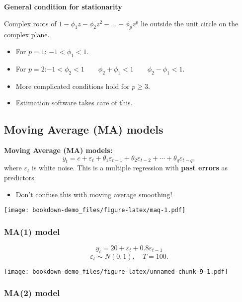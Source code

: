 \documentclass[]{book}
\providecommand{\tightlist}{%
  \setlength{\itemsep}{0pt}\setlength{\parskip}{0pt}}
\begin{document}
\textbf{General condition for stationarity}

Complex roots of \(1-\phi_1 z - \phi_2 z^2 - \dots - \phi_pz^p\) lie outside the unit circle on the complex plane.

\begin{itemize}
\tightlist
\item
  For \(p=1\): \(-1<\phi_1<1\).
\item
  For \(p=2\):\newline \(-1<\phi_2<1\qquad \phi_2+\phi_1 < 1 \qquad \phi_2 -\phi_1 < 1\).
\item
  More complicated conditions hold for \(p\ge3\).
\item
  Estimation software takes care of this.
\end{itemize}

\hypertarget{moving-average-ma-models}{%
\subsection{Moving Average (MA) models}\label{moving-average-ma-models}}

\textbf{Moving Average (MA) models:}
\[y_{t} = c + \varepsilon_t + \theta_{1}\varepsilon_{t - 1} + \theta_{2}\varepsilon_{t - 2} + \cdots + \theta_{q}\varepsilon_{t - q},\]
where \(\varepsilon_t\) is white noise.
This is a multiple regression with \textbf{past errors} as predictors.

\begin{itemize}
\tightlist
\item
  Don't confuse this with moving average smoothing!
\end{itemize}

\texttt{[image: bookdown-demo\_files/figure-latex/maq-1.pdf]}

\hypertarget{ma1-model}{%
\subsubsection{MA(1) model}\label{ma1-model}}

\[y_t = 20 + \varepsilon_t + 0.8 \varepsilon_{t-1}\]
\[\varepsilon_t\sim N(0,1),\quad T=100.\]

\texttt{[image: bookdown-demo\_files/figure-latex/unnamed-chunk-9-1.pdf]}

\hypertarget{ma2-model}{%
\subsubsection{MA(2) model}\label{ma2-model}}
\end{document}
